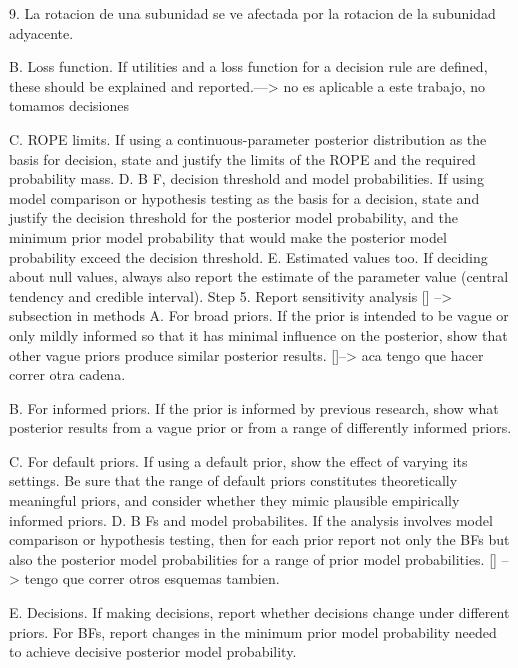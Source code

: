 \documentclass[a4paper,12pt]{article}
\begin{document}
		9. La rotacion de una subunidad se ve afectada por la rotacion de la subunidad adyacente. 
		
		
		B. Loss function. If utilities and a loss function for a decision rule are defined, these should be explained and reported.---> no es aplicable a este trabajo, no tomamos decisiones 
		
		
		C. ROPE limits. If using a continuous-parameter posterior distribution as the basis for decision, state and justify the limits of the ROPE and the required probability mass.
		D. B
	    F, decision threshold and model probabilities. If using model comparison or hypothesis testing as the basis for a decision, state and justify the decision threshold for the posterior model
		probability, and the minimum prior model probability that would make the posterior model probability exceed the decision threshold.
		E. Estimated values too. If deciding about null values, always also report the estimate of the parameter value (central tendency and credible interval).
		Step 5. Report sensitivity analysis [] --> subsection in methods
		A. For broad priors. If the prior is intended to be vague or only mildly informed so that it has minimal influence on the posterior, show that other vague priors produce similar posterior
		results. []--> aca tengo que hacer correr otra cadena. 
		
		B. For informed priors. If the prior is informed by previous research, show what posterior results from a vague prior or from a range of differently informed priors.
		
		C. For default priors. If using a default prior, show the effect of varying its settings. Be sure that the range of default priors constitutes theoretically meaningful priors, and consider whether
		they mimic plausible empirically informed priors.
		D. B
		Fs and model probabilites. If the analysis involves model comparison or hypothesis testing, then for each prior report not only the BFs but also the posterior model probabilities for a
		range of prior model probabilities. [] --> tengo que correr otros esquemas tambien. 
		
		E. Decisions. If making decisions, report whether decisions change under different priors. For BFs, report changes in the minimum prior model probability needed to achieve decisive
		posterior model probability.
		
\end{document}
